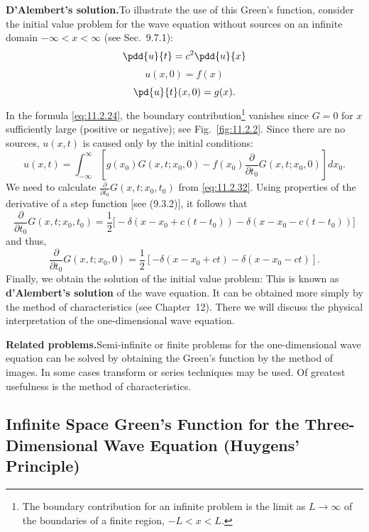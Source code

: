 \textbf{D'Alembert's solution.}\quad To illustrate the use of this Green's function, consider the initial value problem for the wave equation without sources on an infinite domain $-\infty < x < \infty$ (see Sec.~9.7.1):
\begin{equation}
\label{eq:11.2.33}
\pdd{u}{t} = c^2\pdd{u}{x}
\end{equation}
\begin{equation}
\label{eq:11.2.34}
u(x,0) = f(x)
\end{equation}
\begin{equation}
\label{eq:11.2.35}
\pd{u}{t}(x,0) = g(x).
\end{equation}
In the formula \eqref{eq:11.2.24}, the boundary contribution\footnote{The boundary contribution for an infinite problem is the limit as $L \to \infty$ of the boundaries of a finite region, $-L < x < L$.} vanishes since $G = 0$ for $x$ sufficiently large (positive or negative); see Fig.~\ref{fig:11.2.2}.  Since there are no sources, $u(x,t)$ is caused only by the initial conditions:
\[
u(x,t) = \int_{-\infty}^{\infty} \left[g(x_0)G(x,t;x_0,0) - f(x_0)\frac{\partial}{\partial t_0}G(x,t;x_0,0)\right] dx_0.
\]
We need to calculate $\frac{\partial}{\partial t_0}G(x,t;x_0,t_0)$ from \eqref{eq:11.2.32}.  Using properties of the derivative of a step function [see (9.3.2)], it follows that
\[
\frac{\partial}{\partial t_0}G(x,t;x_0,t_0) = \frac{1}{2}\bigl[-\delta(x - x_0 + c(t-t_0)) - \delta(x - x_0 - c(t-t_0))\bigr]
\]
and thus,
\[
\frac{\partial}{\partial t_0}G(x,t;x_0,0) = \frac{1}{2}[-\delta(x - x_0 + ct) - \delta(x - x_0 - ct)].
\]
Finally, we obtain the solution of the initial value problem:
This is known as \textbf{d'Alembert's solution} of the wave equation.  It can be obtained more simply by the method of characteristics (see Chapter~12).  There we will discuss the physical interpretation of the one-dimensional wave equation.

\textbf{Related problems.}\quad Semi-infinite or finite problems for the one-dimensional wave equation can be solved by obtaining the Green's function by the method of images.  In some cases transform or series techniques may be used.  Of greatest usefulness is the method of characteristics.

\subsection{Infinite Space Green's Function for the Three-Dimensional Wave Equation (Huygens' Principle)}
\label{subsec:3d-greens-wave}

